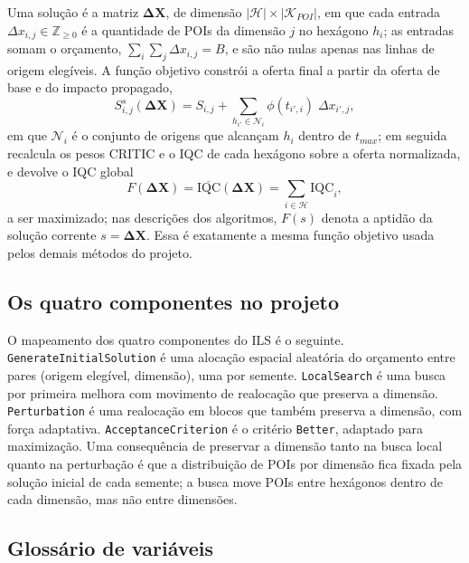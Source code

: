 \documentclass[11pt,a4paper]{article}
\newcommand{\code}[1]{\texttt{#1}}
\begin{document}
Uma solução é a matriz $\mathbf{\Delta X}$, de dimensão $|\mathcal{H}| \times |\mathcal{K}_{POI}|$, em que cada entrada $\Delta x_{i,j} \in \mathbb{Z}_{\ge 0}$ é a quantidade de POIs da dimensão $j$ no hexágono $h_i$; as entradas somam o orçamento, $\sum_i \sum_j \Delta x_{i,j} = B$, e são não nulas apenas nas linhas de origem elegíveis. A função objetivo constrói a oferta final a partir da oferta de base e do impacto propagado,
\begin{equation}
S^{s}_{i,j}(\mathbf{\Delta X}) = S_{i,j} + \sum_{h_{i'} \in \mathcal{N}_i} \phi(t_{i',i})\; \Delta x_{i',j},
\label{eq:final-matrix}
\end{equation}
em que $\mathcal{N}_i$ é o conjunto de origens que alcançam $h_i$ dentro de $t_{max}$; em seguida recalcula os pesos CRITIC e o IQC de cada hexágono sobre a oferta normalizada, e devolve o IQC global
\begin{equation}
F(\mathbf{\Delta X}) = \overline{\mathrm{IQC}}(\mathbf{\Delta X}) = \sum_{i \in \mathcal{H}} \mathrm{IQC}_i,
\label{eq:objetivo}
\end{equation}
a ser maximizado; nas descrições dos algoritmos, $F(s)$ denota a aptidão da solução corrente $s = \mathbf{\Delta X}$. Essa é exatamente a mesma função objetivo usada pelos demais métodos do projeto.

\subsection{Os quatro componentes no projeto}

O mapeamento dos quatro componentes do ILS é o seguinte. \code{GenerateInitialSolution} é uma alocação espacial aleatória do orçamento entre pares (origem elegível, dimensão), uma por semente. \code{LocalSearch} é uma busca por primeira melhora com movimento de realocação que preserva a dimensão. \code{Perturbation} é uma realocação em blocos que também preserva a dimensão, com força adaptativa. \code{AcceptanceCriterion} é o critério \code{Better}, adaptado para maximização. Uma consequência de preservar a dimensão tanto na busca local quanto na perturbação é que a distribuição de POIs por dimensão fica fixada pela solução inicial de cada semente; a busca move POIs entre hexágonos dentro de cada dimensão, mas não entre dimensões.

\subsection{Glossário de variáveis}
\end{document}
